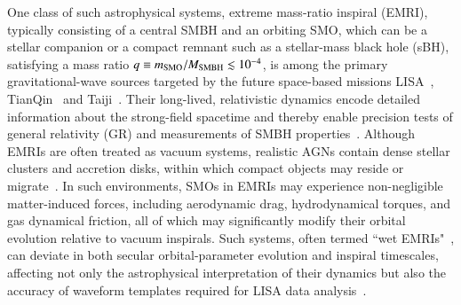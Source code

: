 \documentclass[aps,prx,reprint,superscriptaddress,nofootinbib,longbibliography]{revtex4-1}
\begin{document}



 One class of such astrophysical systems, extreme mass-ratio inspiral (EMRI), typically consisting of a central SMBH and an orbiting SMO, which can be a stellar companion or a compact remnant such as a stellar-mass black hole (sBH), satisfying a mass ratio $q\equiv m_{\rm SMO}/M_{\rm SMBH}\lesssim 10^{-4}$, is among the primary gravitational-wave sources targeted by the future space-based missions LISA~\cite{baker2019laserinterferometerspaceantenna}, TianQin~\cite{10.1093/ptep/ptaa114} and Taiji~\cite{10.1093/ptep/ptaa083}. Their long-lived, relativistic dynamics encode detailed information about the strong-field spacetime and thereby enable precision tests of general relativity (GR) and measurements of SMBH properties~\cite{AmaroSeoane2018,Barack:2018yvs,Gair:2012nm}. Although EMRIs are often treated as vacuum systems, realistic AGNs contain dense stellar clusters and accretion disks, within which compact objects may reside or migrate~\cite{PhysRevD.75.024034,10.1111/j.1365-2966.2006.11155.x,PhysRevD.103.103018,PhysRevD.104.063007,Pan_2021,PhysRevD.105.083005,10.1093/mnras/stad749}.
 In such environments, SMOs in EMRIs may experience non-negligible matter-induced forces, including aerodynamic drag, hydrodynamical torques, and gas dynamical friction, all of which may significantly modify their orbital evolution relative to vacuum inspirals. Such systems, often termed ``wet EMRIs"~\cite{PhysRevD.104.063007}, can deviate in both secular orbital-parameter evolution and inspiral timescales, affecting not only the astrophysical interpretation of their dynamics but also the accuracy of waveform templates required for LISA data analysis~\cite{PhysRevD.84.024032,10.1093/mnras/staa3976,10.1093/mnras/stz1026}.
\end{document}
